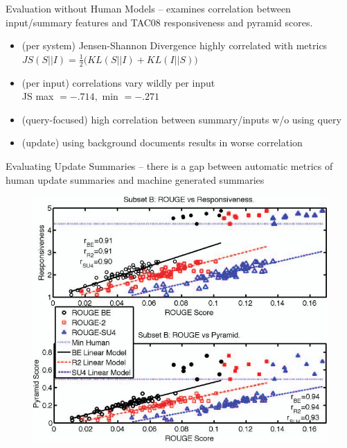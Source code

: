 \documentclass{beamer}
\begin{document}
\begin{frame}{Evaluation without Human Models}
\cite{louis2009automatically} -- examines correlation between input/summary 
    features and TAC08 responsiveness and pyramid scores.
\begin{itemize}
\item (per system) Jensen-Shannon Divergence highly correlated with metrics \\
 $\displaystyle JS(S||I) = \frac{1}{2}\Big(KL(S||I) + KL(I||S) \Big)$
\item (per input) correlations vary wildly per input \\
  JS max $ =-.714, $ min $ =-.271$
\item (query-focused) high correlation between summary/inputs w/o using query
\item (update) using background documents results in worse correlation
\end{itemize}
\end{frame}


\begin{frame}{Evaluating Update Summaries}
\cite{conroy2011nouveau} -- there is a gap between automatic metrics of human 
 update summaries and machine generated summaries
\begin{figure}
\centering
\includegraphics[width=\linewidth,height=.7\textheight,keepaspectratio]{metric_gap_rouge.jpg}
\end{figure}
\end{frame}
\end{document}
